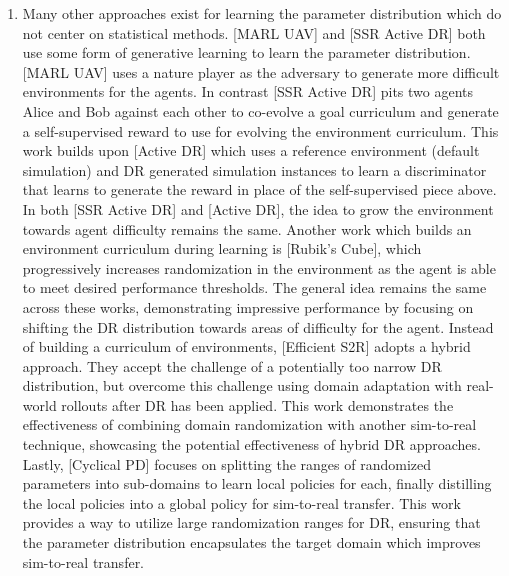 \begin{enumerate}
  \item Many other approaches exist for learning the parameter distribution which do not center on statistical methods. [MARL UAV] and [SSR Active DR] both use some form of generative learning to learn the parameter distribution. [MARL UAV] uses a nature player as the adversary to generate more difficult environments for the agents. In contrast [SSR Active DR] pits two agents Alice and Bob against each other to co-evolve a goal curriculum and generate a self-supervised reward to use for evolving the environment curriculum. This work builds upon [Active DR] which uses a reference environment (default simulation) and DR generated simulation instances to learn a discriminator that learns to generate the reward in place of the self-supervised piece above. In both [SSR Active DR] and [Active DR], the idea to grow the environment towards agent difficulty remains the same. Another work which builds an environment curriculum during learning is [Rubik’s Cube], which progressively increases randomization in the environment as the agent is able to meet desired performance thresholds. The general idea remains the same across these works, demonstrating impressive performance by focusing on shifting the DR distribution towards areas of difficulty for the agent. Instead of building a curriculum of environments, [Efficient S2R] adopts a hybrid approach. They accept the challenge of a potentially too narrow DR distribution, but overcome this challenge using domain adaptation with real-world rollouts after DR has been applied. This work demonstrates the effectiveness of combining domain randomization with another sim-to-real technique, showcasing the potential effectiveness of hybrid DR approaches. Lastly, [Cyclical PD] focuses on splitting the ranges of randomized parameters into sub-domains to learn local policies for each, finally distilling the local policies into a global policy for sim-to-real transfer. This work provides a way to utilize large randomization ranges for DR, ensuring that the parameter distribution encapsulates the target domain which improves sim-to-real transfer.
\end{enumerate}

